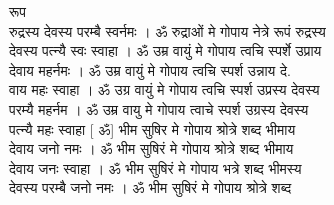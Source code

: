 \documentclass[11pt, openany]{book}
\begin{document}
{{{{{{{{{{{{{{{{{{{{{{{{{{{{{{{{{{{{{{{{{{{{{{{{{{{{{{{{{{{{{{{{{{{{{{{{{{{{{{{{{{{{{{{{{{{{रूप\\
रुद्रस्य देवस्य परम्बै स्वर्नमः । ॐ रुद्राओं मे गोपाय नेत्रे रूपं
रुद्रस्य\\
देवस्य पत्न्यै स्वः स्वाहा । ॐ उम्र वायुं मे गोपाय त्वचि स्पर्शे
उप्राय\\
देवाय महर्नमः । ॐ उम्र वायुं मे गोपाय त्वचि स्पर्श उन्नाय दे.\\
वाय महः स्वाहा । ॐ उग्र वायुं मे गोपाय त्वचि स्पर्श उप्रस्य देवस्य\\
परम्यै महर्नम । ॐ उम्र वायु मे गोपाय त्वाचे स्पर्श उग्रस्य देवस्य\\
पत्न्यै महः स्वाहा \textbar{} {[} ॐ{]} भीम सुषिर मे गोपाय श्रोत्रे शब्द
भीमाय\\
देवाय जनो नमः । ॐ भीम सुषिरं मे गोपाय श्रोत्रे शब्द भीमाय\\
देवाय जनः स्वाहा । ॐ भीम सुषिरं मे गोपाय भत्रे शब्द भीमस्य\\
देवस्य परम्बै जनो नमः । ॐ भीम सुषिरं मे गोपाय श्रोत्रे शब्द\\


}}}}}}}}}}}}}}}}}}}}}}}}}}}}}}}}}}}}}}}}}}}}}}}}}}}}}}}}}}}}}}}}}}}}}}}}}}}}}}}}}}}}}}}}}}}}
\end{document}
